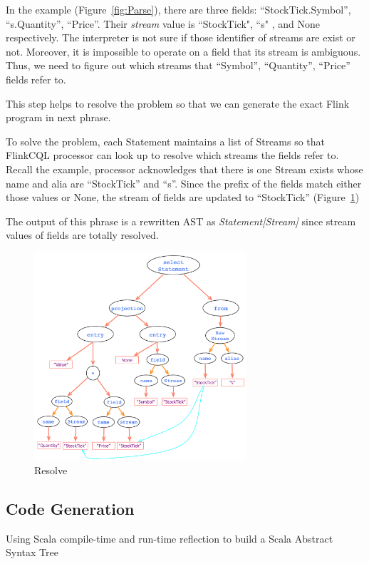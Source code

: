 In the example (Figure~\ref{fig:Parse}), there are three fields: ``StockTick.Symbol”, ``s.Quantity”, ``Price”. Their \textit{stream} value is ``StockTick", ``s" , and None respectively. The interpreter is not sure if those identifier of streams are exist or not. Moreover, it is impossible to operate on a field that its stream is ambiguous. Thus, we need to figure out  which streams that ``Symbol”, ``Quantity”, ``Price”  fields refer to.

This step helps to resolve the problem so that we can generate the exact Flink program in next phrase.

To solve the problem, each Statement maintains a list of Streams so that FlinkCQL processor can look up to resolve which streams the fields refer to. Recall the example, processor acknowledges that there is one Stream exists whose name and alia are ``StockTick'' and ``s''. Since the prefix of the fields match either those values or None, the stream of fields are updated to ``StockTick'' (Figure~\ref{fig:Resolve})

The output of this phrase is a rewritten AST as \textit{Statement[Stream]} since stream values of  fields are totally resolved.

\begin{figure}[h!] 
\centering    
\includegraphics[width=0.7\textwidth]{Resolve}
\caption{Resolve}
\label{fig:Resolve}
\end{figure}


\subsection{Code Generation}
Using Scala compile-time and run-time reflection to build a Scala Abstract Syntax Tree


